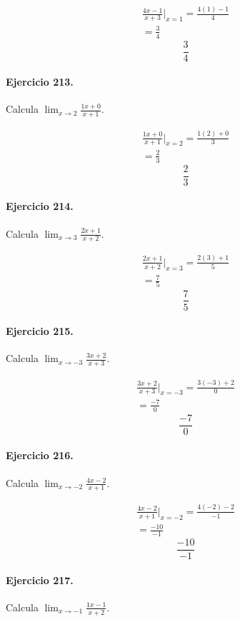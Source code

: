 \documentclass[11pt,a4paper]{article}
\begin{document}
\[
\begin{aligned}
\frac{4x-1}{x+3}\Big|_{x=1}=\frac{4(1)-1}{4}\\
=\frac{3}{4}
\end{aligned}
\]
\[\boxed{\frac{3}{4}}\]


\paragraph{Ejercicio 213.} Calcula $\displaystyle\lim_{x\to 2}\frac{1x+0}{x+1}$. 

\[
\begin{aligned}
\frac{1x+0}{x+1}\Big|_{x=2}=\frac{1(2)+0}{3}\\
=\frac{2}{3}
\end{aligned}
\]
\[\boxed{\frac{2}{3}}\]


\paragraph{Ejercicio 214.} Calcula $\displaystyle\lim_{x\to 3}\frac{2x+1}{x+2}$. 

\[
\begin{aligned}
\frac{2x+1}{x+2}\Big|_{x=3}=\frac{2(3)+1}{5}\\
=\frac{7}{5}
\end{aligned}
\]
\[\boxed{\frac{7}{5}}\]


\paragraph{Ejercicio 215.} Calcula $\displaystyle\lim_{x\to -3}\frac{3x+2}{x+3}$. 

\[
\begin{aligned}
\frac{3x+2}{x+3}\Big|_{x=-3}=\frac{3(-3)+2}{0}\\
=\frac{-7}{0}
\end{aligned}
\]
\[\boxed{\frac{-7}{0}}\]


\paragraph{Ejercicio 216.} Calcula $\displaystyle\lim_{x\to -2}\frac{4x-2}{x+1}$. 

\[
\begin{aligned}
\frac{4x-2}{x+1}\Big|_{x=-2}=\frac{4(-2)-2}{-1}\\
=\frac{-10}{-1}
\end{aligned}
\]
\[\boxed{\frac{-10}{-1}}\]


\paragraph{Ejercicio 217.} Calcula $\displaystyle\lim_{x\to -1}\frac{1x-1}{x+2}$. 
\end{document}
